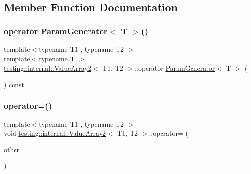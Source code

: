 \subsection{Member Function Documentation}
\mbox{\label{classtesting_1_1internal_1_1_value_array2_aa81899f10bfd345c17aae540acc296a9}} 
\subsubsection{\texorpdfstring{operator ParamGenerator$<$ T $>$()}{operator ParamGenerator< T >()}}
{\footnotesize\ttfamily template$<$typename T1 , typename T2 $>$ \\
template$<$typename T $>$ \\
\mbox{\hyperlink{classtesting_1_1internal_1_1_value_array2}{testing\+::internal\+::\+Value\+Array2}}$<$ T1, T2 $>$\+::operator \mbox{\hyperlink{classtesting_1_1internal_1_1_param_generator}{Param\+Generator}}$<$ T $>$ (\begin{DoxyParamCaption}{ }\end{DoxyParamCaption}) const\hspace{0.3cm}{\ttfamily [inline]}}

\mbox{\label{classtesting_1_1internal_1_1_value_array2_a50dca762b20042440ea532503f7e0b71}} 
\subsubsection{\texorpdfstring{operator=()}{operator=()}}
{\footnotesize\ttfamily template$<$typename T1 , typename T2 $>$ \\
void \mbox{\hyperlink{classtesting_1_1internal_1_1_value_array2}{testing\+::internal\+::\+Value\+Array2}}$<$ T1, T2 $>$\+::operator= (\begin{DoxyParamCaption}\item[{const \mbox{\hyperlink{classtesting_1_1internal_1_1_value_array2}{Value\+Array2}}$<$ T1, T2 $>$ \&}]{other }\end{DoxyParamCaption})\hspace{0.3cm}{\ttfamily [private]}}



